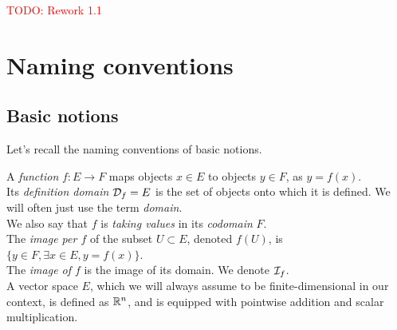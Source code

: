 \textcolor{red}{TODO: Rework 1.1}







\section{Naming conventions}
\label{basic}

\subsection{Basic notions}

Let's recall the naming conventions of basic notions.

A \emph{function} $f: E \rightarrow F$ maps objects $x \in E$ to objects $y \in F$, as $y = f(x)$.\\
Its \emph{definition domain} $\mathcal{D}_f = E$ is the set of objects onto which it is defined. We will often just use the term \emph{domain}.\\
We also say that $f$ is \emph{taking values} in its \emph{codomain} $F$.\\
The \emph{image per $f$} of the subset $U \subset E$, denoted $f(U)$, is $\{y \in F, \exists x \in E, y = f(x)\}$.\\
The \emph{image of $f$} is the image of its domain. We denote $\mathcal{I}_f$.\\
A vector space $E$, which we will always assume to be finite-dimensional in our context, is defined as $\mathbb{R}^n$, and is equipped with pointwise addition and scalar multiplication.%

